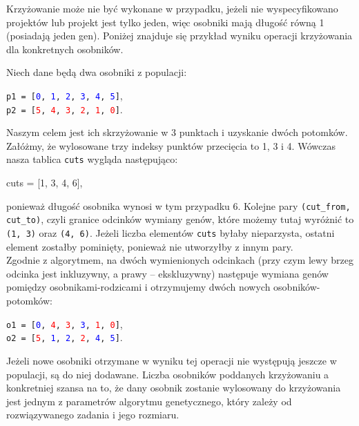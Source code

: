 \documentclass[12pt,a4paper]{article}
\theoremstyle{definition}
\begin{document}
\vspace{0.5em}
\noindent
Krzyżowanie może nie być wykonane w przypadku, jeżeli nie wyspecyfikowano projektów lub projekt jest tylko jeden, więc osobniki mają długość równą 1 (posiadają jeden gen). Poniżej znajduje się przykład wyniku operacji krzyżowania dla konkretnych osobników.\\

\begin{tcolorbox}[title=Przykład --- operacja krzyżowania]
Niech dane będą dwa osobniki z populacji:
\begin{center}
	\texttt{p1 = [\textcolor{blue}{0}, \textcolor{blue}{1}, \textcolor{blue}{2}, \textcolor{blue}{3}, \textcolor{blue}{4}, \textcolor{blue}{5}]},\\
	\texttt{p2 = [\textcolor{red}{5}, \textcolor{red}{4}, \textcolor{red}{3}, \textcolor{red}{2}, \textcolor{red}{1}, \textcolor{red}{0}]}.
\end{center}
Naszym celem jest ich skrzyżowanie w 3 punktach i uzyskanie dwóch potomków. Załóżmy, że wylosowane trzy indeksy punktów przecięcia to 1, 3 i 4. Wówczas nasza tablica \texttt{cuts} wygląda następująco:
\begin{center}
	cuts = [1, 3, 4, 6],
\end{center}
ponieważ długość osobnika wynosi w tym przypadku 6. Kolejne pary \texttt{(cut\_from, cut\_to)}, czyli granice odcinków wymiany genów, które możemy tutaj wyróżnić to \texttt{(1, 3)} oraz \texttt{(4, 6)}. Jeżeli liczba elementów \texttt{cuts} byłaby nieparzysta, ostatni element zostałby pominięty, ponieważ nie utworzyłby z innym pary.\\

\noindent
Zgodnie z algorytmem, na dwóch wymienionych odcinkach (przy czym lewy brzeg odcinka jest inkluzywny, a prawy -- ekskluzywny) następuje wymiana genów pomiędzy osobnikami-rodzicami i otrzymujemy dwóch nowych osobników-potomków:
\begin{center}
	\texttt{o1 = [\textcolor{blue}{0}, \textcolor{red}{4}, \textcolor{red}{3}, \textcolor{blue}{3}, \textcolor{red}{1}, \textcolor{red}{0}]},\\
	\texttt{o2 = [\textcolor{red}{5}, \textcolor{blue}{1}, \textcolor{blue}{2}, \textcolor{red}{2}, \textcolor{blue}{4}, \textcolor{blue}{5}]}.
\end{center}
\end{tcolorbox}

\vspace{0.5em}
\noindent
Jeżeli nowe osobniki otrzymane w wyniku tej operacji nie występują jeszcze w populacji, są do niej dodawane. Liczba osobników poddanych krzyżowaniu a konkretniej szansa na to, że dany osobnik zostanie wylosowany do krzyżowania jest jednym z parametrów algorytmu genetycznego, który zależy od rozwiązywanego zadania i jego rozmiaru.
\end{document}
